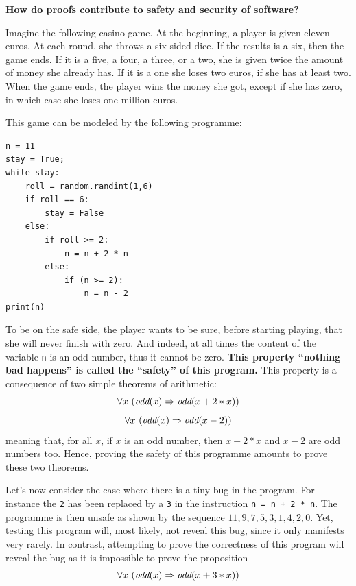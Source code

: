 \begin{shaded}
\vspace*{-0.5cm}
\begin{center}
{\bf \Large How do proofs contribute to safety and security of software?}
\end{center}

Imagine the following casino game. At the beginning, a player is given
eleven euros. At each round, she throws a six-sided dice. If the
results is a six, then the game ends.  If it is a five, a four, a
three, or a two, she is given twice the amount of money she already
has. If it is a one she loses two euros, if she has at least two.
When the game ends, the player wins the money she got, except if she
has zero, in which case she loses one million euros.

This game can be modeled by the following programme:
\begin{center}
    \begin{minipage}{10cm}
\begin{verbatim}
n = 11
stay = True;
while stay:
    roll = random.randint(1,6)
    if roll == 6:
        stay = False
    else:
        if roll >= 2:
            n = n + 2 * n
        else:
            if (n >= 2):
                n = n - 2
print(n)
\end{verbatim}
    \end{minipage}
\end{center}

To be on the safe side, the player wants to be sure, before starting
playing, that she will never finish with zero.  And indeed, at all times
the content of the variable {\tt n} is an odd number,
thus it cannot be zero. {\bf This property ``nothing bad happens'' is
called the ``safety'' of this program.} This property is a
consequence of two simple theorems of arithmetic:
$$\forall x~(\mbox{\it odd}(x) \Rightarrow \mbox{\it odd}(x + 2 * x))$$
$$\forall x~(\mbox{\it odd}(x) \Rightarrow \mbox{\it odd}(x - 2))$$
meaning that, for all $x$, if $x$ is an odd number, then $x+2*x$ and $x-2$ are odd numbers too.
Hence, proving the safety of this programme amounts to prove these two
theorems.

Let's now consider the case where there is a tiny bug in the
program. For instance the {\tt 2} has been replaced by a {\tt 3} in
the instruction {\tt n = n + 2 * n}. The programme is then unsafe as
shown by the sequence $11, 9, 7, 5, 3, 1, 4, 2, 0$. Yet, testing this
program will, most likely, not reveal this bug, since it only
manifests very rarely.  In contrast, attempting to prove the
correctness of this program will reveal the bug as it is impossible to
prove the proposition
$$\forall x~(\mbox{\it odd}(x) \Rightarrow \mbox{\it odd}(x + 3 * x))$$
\end{shaded}

